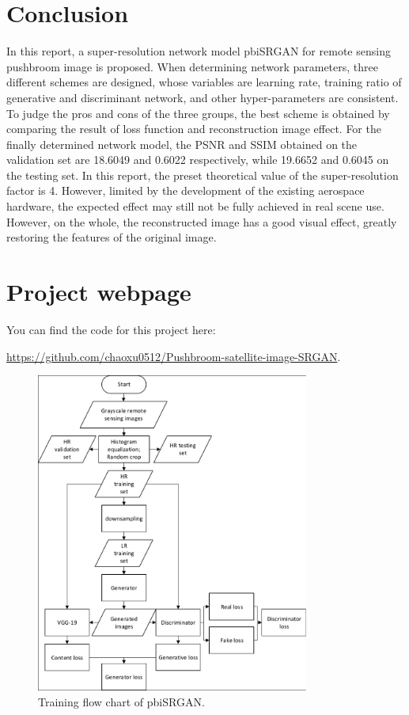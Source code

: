 \documentclass[10pt,twocolumn,letterpaper]{article}
\begin{document}
\section{Conclusion}
In this report, a super-resolution network model pbiSRGAN for remote sensing pushbroom image is proposed. When determining network parameters, three different schemes are designed, whose variables are learning rate, training ratio of generative and discriminant network, and other hyper-parameters are consistent. To judge the pros and cons of the three groups, the best scheme is obtained by comparing the result of loss function and reconstruction image effect. For the finally determined network model, the PSNR and SSIM obtained on the validation set are 18.6049 and 0.6022 respectively,  while 19.6652 and 0.6045 on the testing set. In this report, the preset theoretical value of the super-resolution factor is 4. However, limited by the development of the existing aerospace hardware, the expected effect may still not be fully achieved in real scene use. However, on the whole, the reconstructed image has a good visual effect, greatly restoring the features of the original image.

\section*{Project webpage}
You can find the code for this project here:

\url{https://github.com/chaoxu0512/Pushbroom-satellite-image-SRGAN}. 

{\small


}


\begin{figure}
\begin{center}
\includegraphics[width=0.8\textwidth]{fig1}
\end{center}
   \caption{Training flow chart of pbiSRGAN.}
\label{fig1}
\end{figure}
\end{document}
